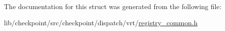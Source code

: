 The documentation for this struct was generated from the following file\+:\begin{DoxyCompactItemize}
\item 
lib/checkpoint/src/checkpoint/dispatch/vrt/\hyperlink{registry__common_8h}{registry\+\_\+common.\+h}\end{DoxyCompactItemize}
